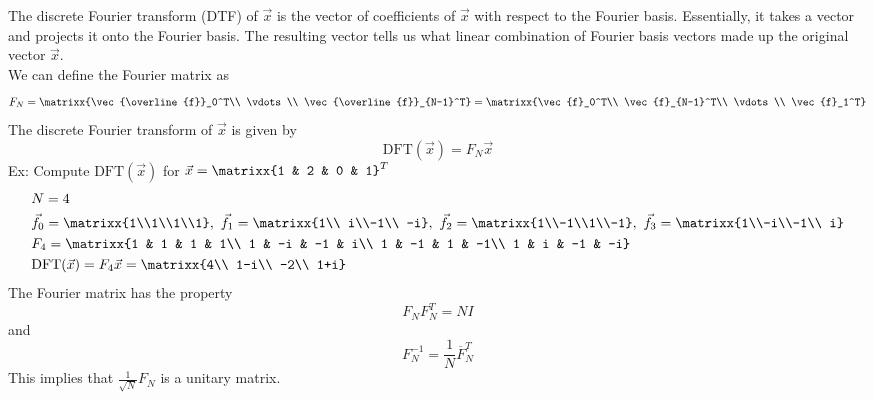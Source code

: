 The discrete Fourier transform (DTF) of $\vec{x}$ is the vector of coefficients of $\vec{x}$ with respect to the Fourier basis. Essentially, it takes a vector and projects it onto the Fourier basis. The resulting vector tells us what linear combination of Fourier basis vectors made up the original vector $\vec{x}$.\\
We can define the Fourier matrix as
$$F_N=\matrixx{\vec{\overline{f}}_0^T\\ \vdots\\ \vec{\overline{f}}_{N-1}^T}=\matrixx{\vec{f}_0^T\\ \vec{f}_{N-1}^T\\ \vdots\\ \vec{f}_1^T}$$
The discrete Fourier transform of $\vec{x}$ is given by
$$\mathrm{DFT}(\vec{x})=F_N\vec{x}$$
Ex: Compute $\mathrm{DFT}(\vec{x})$ for $\vec{x}=\matrixx{1 & 2 & 0 & 1}^T$
\begin{align*}
    &N=4\\
    &\vec{f}_0=\matrixx{1\\1\\1\\1},\ \vec{f}_1=\matrixx{1\\ i\\-1\\ -i},\ \vec{f}_2=\matrixx{1\\-1\\1\\-1},\ \vec{f}_3=\matrixx{1\\-i\\-1\\ i}\\
    &F_4=\matrixx{1 & 1 & 1 & 1\\ 1 & -i & -1 & i\\ 1 & -1 & 1 & -1\\ 1 & i & -1 & -i}\\
    &\mathrm{DFT}(\vec{x})=F_4\vec{x}=\matrixx{4\\ 1-i\\ -2\\ 1+i}
\end{align*}
The Fourier matrix has the property
$$F_NF_N^T=NI$$
and
$$F_N^{-1}=\frac{1}{N}\overline{F}_N^T$$
This implies that $\frac{1}{\sqrt{N}}F_N$ is a unitary matrix.\\

